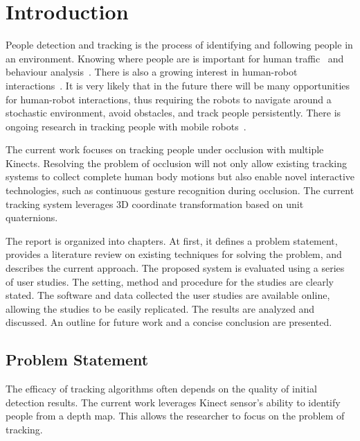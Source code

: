 


\chapter{Introduction}

\label{chapter:introduction}

People detection and tracking is the process of identifying and following people in an environment. Knowing where people are is important for human traffic~\cite{yang_count_people} and behaviour analysis~\cite{seer_pedestrian_behaviour, arar_gaze_estimation}. There is also a growing interest in human-robot interactions~\cite{mutlu_human_robot_interaction}. It is very likely that in the future there will be many opportunities for human-robot interactions, thus requiring the robots to navigate around a stochastic environment, avoid obstacles, and track people persistently. There is ongoing research in tracking people with mobile robots~\cite{choi_indoor_robots, munaro_tracking_within_groups_with_mobile_robot, munaro_tracking_2, glas_people_tracking_robot_localization, satake_stereo_robot}.

The current work focuses on tracking people under occlusion with multiple Kinects. Resolving the problem of occlusion will not only allow existing tracking systems to collect complete human body motions but also enable novel interactive technologies, such as continuous gesture recognition during occlusion. The current tracking system leverages 3D coordinate transformation based on unit quaternions.

The report is organized into chapters. At first, it defines a problem statement, provides a literature review on existing techniques for solving the problem, and describes the current approach. The proposed system is evaluated using a series of user studies. The setting, method and procedure for the studies are clearly stated. The software and data collected the user studies are available online, allowing the studies to be easily replicated. The results are analyzed and discussed. An outline for future work and a concise conclusion are presented.

\section{Problem Statement}
\label{sec:introduction_problem_statement}

The efficacy of tracking algorithms often depends on the quality of initial detection results. The current work leverages Kinect sensor's ability to identify people from a depth map. This allows the researcher to focus on the problem of tracking.

